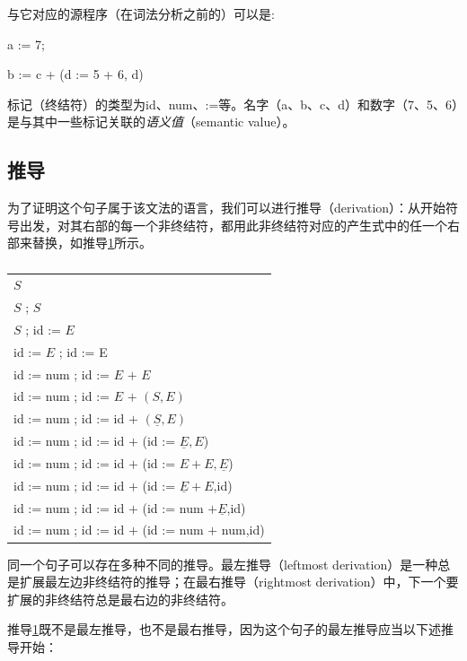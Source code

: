 \documentclass[cn,11pt,chinese]{elegantbook}
\begin{document}
与它对应的源程序（在词法分析之前的）可以是:

a := 7;

b := c + (d := 5 + 6, d)

标记（终结符）的类型为id、num、:=等。名字（a、b、c、d）和数字（7、5、6）是与其中一些标记关联的\textit{语义值}（semantic value）。

\subsection{推导}

为了证明这个句子属于该文法的语言，我们可以进行推导（derivation）：从开始符号出发，对其右部的每一个非终结符，都用此非终结符对应的产生式中的任一个右部来替换，如推导\ref{derivation:3-1}所示。

\renewcommand\tablename{推导}
\begin{table}[htbp]
\centering
\begin{tabular}{l}
  \toprule
  \underline{$S$} \\
  $S$ ; \underline{$S$} \\
  \underline{$S$} ; id := $E$ \\
  id := \underline{$E$} ; id := E \\
  id := num ; id := $E$ $+$ \underline{$E$} \\
  id := num ; id := \underline{$E$} $+$ $(S,E)$ \\
  id := num ; id := id $+$ $(\underline{S},E)$ \\
  id := num ; id := id $+$ (id := $\underline{E},E$) \\
  id := num ; id := id $+$ (id := $E + E,\underline{E}$) \\
  id := num ; id := id $+$ (id := $\underline{E} + E$,id) \\
  id := num ; id := id $+$ (id := num $+ \underline{E}$,id) \\
  id := num ; id := id $+$ (id := num $+$ num,id) \\
  \bottomrule
\end{tabular}
\caption{}\label{derivation:3-1}
\end{table}
\renewcommand\tablename{表}

同一个句子可以存在多种不同的推导。最左推导（leftmost derivation）是一种总是扩展最左边非终结符的推导；在最右推导（rightmost derivation）中，下一个要扩展的非终结符总是最右边的非终结符。

推导\ref{derivation:3-1}既不是最左推导，也不是最右推导，因为这个句子的最左推导应当以下述推导开始：
\end{document}
